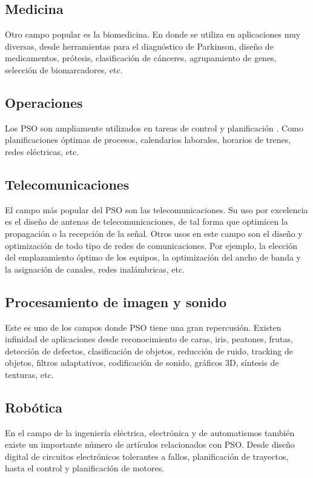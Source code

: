 \documentclass[a4paper,12pt,titlepage]{article}
\begin{document}
\subsection{Medicina}

Otro campo popular es la biomedicina. En donde se utiliza en aplicaciones muy diversas, desde herramientas para el diagnóstico de Parkinson, diseño de medicamentos, prótesis, clasificación de cánceres, agrupamiento de genes, selección de biomarcadores, etc.

\subsection{Operaciones}

Los PSO son ampliamente utilizados en tareas de control y planificación . Como planificaciones óptimas de procesos, calendarios laborales, horarios de trenes, redes eléctricas, etc.

\subsection{Telecomunicaciones}

El campo más popular del PSO son las telecomunicaciones. Su uso por excelencia es el diseño de antenas de telecomunicaciones, de tal forma que optimicen la propagación o la recepción de la señal. Otros usos en este campo son el diseño y optimización de todo tipo de redes de comunicaciones. Por ejemplo, la elección del emplazamiento óptimo de los equipos, la optimización del ancho de banda y la asignación de canales, redes inalámbricas, etc.

\subsection{Procesamiento de imagen y sonido}

Este es uno de los campos donde PSO tiene una gran repercusión. Existen infinidad de aplicaciones desde reconocimiento de caras, iris, peatones, frutas, detección de defectos, clasificación de objetos, reducción de ruido, tracking de objetos, filtros adaptativos, codificación de sonido, gráficos 3D, síntesis de texturas, etc.

\subsection{Robótica}

En el campo de la ingeniería eléctrica, electrónica y de automatismos también existe un importante número de artículos relacionados con PSO. Desde diseño digital de circuitos electrónicos tolerantes a fallos, planificación de trayectos, hasta el control y planificación de motores.
\end{document}
